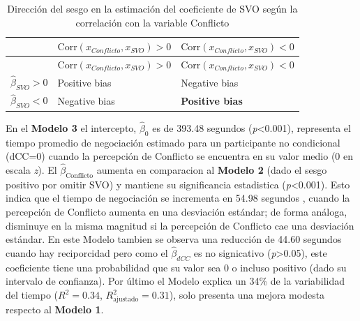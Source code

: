 \documentclass[
  spanish,
  10pt,
]{article}
\begin{document}
\begin{longtable}[]{@{}
  >{\raggedright\arraybackslash}p{}
  >{\centering\arraybackslash}p{}
  >{\centering\arraybackslash}p{}@{}}
\caption{Dirección del sesgo en la estimación del coeficiente de SVO
según la correlación con la variable Conflicto}\tabularnewline
\toprule\noalign{}
\begin{minipage}[b]{\linewidth}\raggedright
\end{minipage} & \begin{minipage}[b]{\linewidth}\centering
\(\text{Corr}(x_{Conflicto}, x_{SVO}) > 0\)
\end{minipage} & \begin{minipage}[b]{\linewidth}\centering
\(\text{Corr}(x_{Conflicto}, x_{SVO}) < 0\)
\end{minipage} \\
\midrule\noalign{}
\endfirsthead
\toprule\noalign{}
\begin{minipage}[b]{\linewidth}\raggedright
\end{minipage} & \begin{minipage}[b]{\linewidth}\centering
\(\text{Corr}(x_{Conflicto}, x_{SVO}) > 0\)
\end{minipage} & \begin{minipage}[b]{\linewidth}\centering
\(\text{Corr}(x_{Conflicto}, x_{SVO}) < 0\)
\end{minipage} \\
\midrule\noalign{}
\endhead
\bottomrule\noalign{}
\endlastfoot
\(\hat\beta_{SVO} > 0\) & Positive bias & Negative bias \\
\(\hat\beta_{SVO} < 0\) & Negative bias & \textbf{Positive bias} \\
\end{longtable}

En el \textbf{Modelo 3} el intercepto, \(\hat{\beta}_0\) es de 393.48
segundos (\emph{p}\textless0.001), representa el tiempo promedio de
negociación estimado para un participante no condicional (dCC=0) cuando
la percepción de Conflicto se encuentra en su valor medio (0 en escala
\emph{z}). El \(\hat{\beta}_{\text{Conflicto}}\) aumenta en comparacion
al \textbf{Modelo 2} (dado el sesgo positivo por omitir SVO) y mantiene
su significancia estadistica (\emph{p}\textless0.001). Esto indica que
el tiempo de negociación se incrementa en 54.98 segundos , cuando la
percepción de Conflicto aumenta en una desviación estándar; de forma
análoga, disminuye en la misma magnitud si la percepción de Conflicto
cae una desviación estándar. En este Modelo tambien se observa una
reducción de 44.60 segundos cuando hay reciporcidad pero como el
\(\hat{\beta}_{dCC}\) es no signicativo (\emph{p}\textgreater0.05), este
coeficiente tiene una probabilidad que su valor sea 0 o incluso positivo
(dado su intervalo de confianza). Por último el Modelo explica un 34\%
de la variabilidad del tiempo (\(R^2 = 0.34\),
\(R^2_{\text{ajustado}} = 0.31\)), solo presenta una mejora modesta
respecto al \textbf{Modelo 1}.
\end{document}
